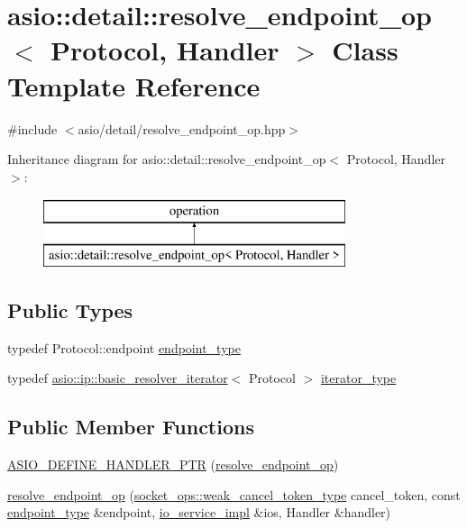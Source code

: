 \hypertarget{classasio_1_1detail_1_1resolve__endpoint__op}{}\section{asio\+:\+:detail\+:\+:resolve\+\_\+endpoint\+\_\+op$<$ Protocol, Handler $>$ Class Template Reference}
\label{classasio_1_1detail_1_1resolve__endpoint__op}


{\ttfamily \#include $<$asio/detail/resolve\+\_\+endpoint\+\_\+op.\+hpp$>$}

Inheritance diagram for asio\+:\+:detail\+:\+:resolve\+\_\+endpoint\+\_\+op$<$ Protocol, Handler $>$\+:\begin{figure}[H]
\begin{center}
\leavevmode
\includegraphics[height=2.000000cm]{classasio_1_1detail_1_1resolve__endpoint__op}
\end{center}
\end{figure}
\subsection*{Public Types}
\begin{DoxyCompactItemize}
\item 
typedef Protocol\+::endpoint \hyperlink{classasio_1_1detail_1_1resolve__endpoint__op_ac3d7acefa9c9de9b1a9c159b5406a3ed}{endpoint\+\_\+type}
\item 
typedef \hyperlink{classasio_1_1ip_1_1basic__resolver__iterator}{asio\+::ip\+::basic\+\_\+resolver\+\_\+iterator}$<$ Protocol $>$ \hyperlink{classasio_1_1detail_1_1resolve__endpoint__op_ad3f31906ec6e628f8da89b193059452c}{iterator\+\_\+type}
\end{DoxyCompactItemize}
\subsection*{Public Member Functions}
\begin{DoxyCompactItemize}
\item 
\hyperlink{classasio_1_1detail_1_1resolve__endpoint__op_a6cc409feb6a0a9f52105c8cb1652ab62}{A\+S\+I\+O\+\_\+\+D\+E\+F\+I\+N\+E\+\_\+\+H\+A\+N\+D\+L\+E\+R\+\_\+\+P\+T\+R} (\hyperlink{classasio_1_1detail_1_1resolve__endpoint__op}{resolve\+\_\+endpoint\+\_\+op})
\item 
\hyperlink{classasio_1_1detail_1_1resolve__endpoint__op_af1f0749393d4be3e943c45f301ceaecb}{resolve\+\_\+endpoint\+\_\+op} (\hyperlink{namespaceasio_1_1detail_1_1socket__ops_a9dbe5bfa22a69dc9a583a8060228860f}{socket\+\_\+ops\+::weak\+\_\+cancel\+\_\+token\+\_\+type} cancel\+\_\+token, const \hyperlink{classasio_1_1detail_1_1resolve__endpoint__op_ac3d7acefa9c9de9b1a9c159b5406a3ed}{endpoint\+\_\+type} \&endpoint, \hyperlink{namespaceasio_1_1detail_a6d61d9b8e53c11288be549d82aec5a42}{io\+\_\+service\+\_\+impl} \&ios, Handler \&handler)
\end{DoxyCompactItemize}
